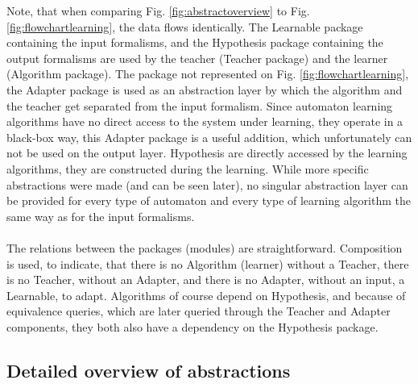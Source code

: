 Note, that when comparing Fig. \ref{fig:abstractoverview} to Fig. \ref{fig:flowchartlearning}, the data flows identically. The Learnable package containing the input formalisms, and the Hypothesis package containing the output formalisms are used by the teacher (Teacher package) and the learner (Algorithm package). The package not represented on Fig. \ref{fig:flowchartlearning}, the Adapter package is used as an abstraction layer by which the algorithm and the teacher get separated from the input formalism. Since automaton learning algorithms have no direct access to the system under learning, they operate in a black-box way, this Adapter package is a useful addition, which unfortunately can not be used on the output layer. Hypothesis are directly accessed by the learning algorithms, they are constructed during the learning. While more specific abstractions were made (and can be seen later), no singular abstraction layer can be provided for every type of automaton and every type of learning algorithm the same way as for the input formalisms.
\\\\
The relations between the packages (modules) are straightforward. Composition is used, to indicate, that there is no Algorithm (learner) without a Teacher, there is no Teacher, without an Adapter, and there is no Adapter, without an input, a Learnable, to adapt. Algorithms of course depend on Hypothesis, and because of equivalence queries, which are later queried through the Teacher and Adapter components, they both also have a dependency on the Hypothesis package.

\subsection{Detailed overview of abstractions}


